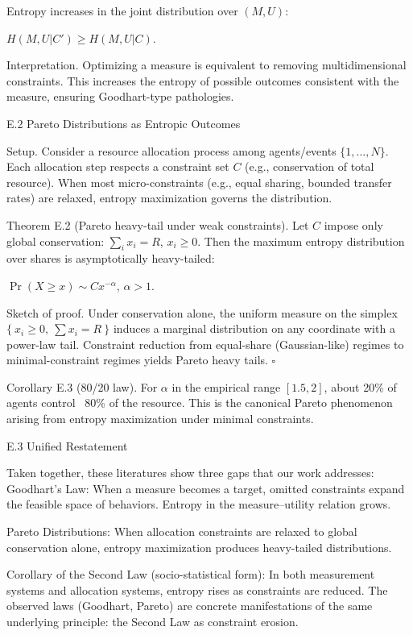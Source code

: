 \documentclass[11pt,a4paper]{article}
\begin{document}
Entropy increases in the joint distribution over $(M, U)$:

$H(M, U | C') \geq H(M, U | C)$.

Interpretation. Optimizing a measure is equivalent to removing multidimensional constraints. This increases the entropy of possible outcomes consistent with the measure, ensuring Goodhart-type pathologies.

E.2 Pareto Distributions as Entropic Outcomes

Setup.
Consider a resource allocation process among agents/events $\{1, \dots, N\}$. Each allocation step respects a constraint set $C$ (e.g., conservation of total resource). When most micro-constraints (e.g., equal sharing, bounded transfer rates) are relaxed, entropy maximization governs the distribution.

Theorem E.2 (Pareto heavy-tail under weak constraints).
Let $C$ impose only global conservation: $\sum_i x_i = R$, $x_i \geq 0$. Then the maximum entropy distribution over shares is asymptotically heavy-tailed:

$\Pr(X \geq x) \sim C x^{-\alpha}$, $\alpha > 1$.

Sketch of proof.
Under conservation alone, the uniform measure on the simplex $\{\ x_i \geq 0,\ \sum x_i = R\ \}$ induces a marginal distribution on any coordinate with a power-law tail. Constraint reduction from equal-share (Gaussian-like) regimes to minimal-constraint regimes yields Pareto heavy tails. $\square$

Corollary E.3 (80/20 law).
For $\alpha$ in the empirical range $[1.5, 2]$, about 20\% of agents control ~80\% of the resource. This is the canonical Pareto phenomenon arising from entropy maximization under minimal constraints.

E.3 Unified Restatement

Taken together, these literatures show three gaps that our work addresses:
Goodhart’s Law: When a measure becomes a target, omitted constraints expand the feasible space of behaviors. Entropy in the measure–utility relation grows.

Pareto Distributions: When allocation constraints are relaxed to global conservation alone, entropy maximization produces heavy-tailed distributions.

Corollary of the Second Law (socio-statistical form): In both measurement systems and allocation systems, entropy rises as constraints are reduced. The observed laws (Goodhart, Pareto) are concrete manifestations of the same underlying principle: the Second Law as constraint erosion.
\end{document}
